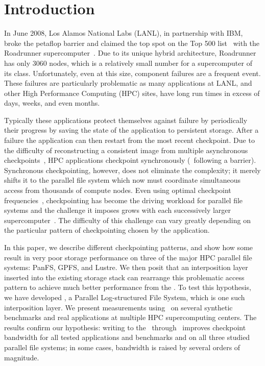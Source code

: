 \section{Introduction}



In June 2008, Los Alamos National Labs (LANL), in partnership with IBM, broke
the petaflop barrier and claimed the top spot on the Top 500 list~\cite{top500}
with the Roadrunner supercomputer~\cite{roadrunner}.  Due to its unique hybrid
architecture, Roadrunner has only 3060 nodes, which is a relatively small
number for a supercomputer of its class.  Unfortunately, even at this size,
component failures are a frequent event.  These failures are particularly
problematic as many applications at LANL, and other High Performance Computing
(HPC) sites, have long run times in excess of days, weeks, and even months.

Typically these applications protect themselves against failure by periodically
 their progress by saving the state of the application to
persistent storage. After a failure the application can then restart from the most recent 
checkpoint.  Due to the difficulty of reconstructing a consistent
image from multiple asynchronous checkpoints~\cite{lamport1978}, HPC
applications checkpoint synchronously (\ie\ following a barrier).  Synchronous
checkpointing, however, does not eliminate the complexity; it merely shifts it to
the parallel file system which now must coordinate simultaneous access from
thousands of compute nodes.  Even using optimal checkpoint frequencies~\cite{daly-optimal}, 
checkpointing has become the driving workload for
parallel file systems and the challenge it imposes grows with each successively
larger supercomputer~\cite{pcl:99:me,schroeder2007}.  The difficulty of this
challenge can vary greatly depending on the particular pattern of checkpointing
chosen by the application. 

In this paper, we describe different checkpointing patterns, and show how some
result in very poor storage performance on three of the major HPC
parallel file systems: PanFS, GPFS, and Lustre.  We then posit that an
interposition layer inserted into the existing storage stack can rearrange this
problematic access pattern to achieve much better performance from the
\upfs.  To test this hypothesis, we have developed \plfs, a Parallel
Log-structured File System, which is one such interposition layer.  We present measurements using \plfs\ on several synthetic benchmarks and real applications at multiple HPC supercomputing centers.  The
results confirm our hypothesis: writing to the \upfs\ through
\plfs\ improves checkpoint bandwidth for all tested applications and
benchmarks and on all three studied parallel file systems; in some cases,
bandwidth is raised by several orders of magnitude.

